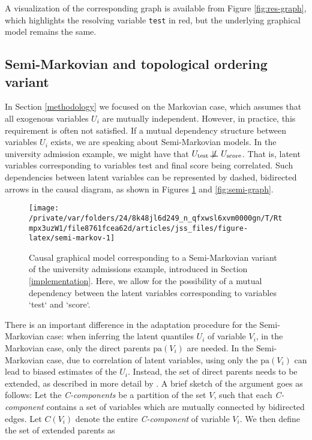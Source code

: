 \documentclass[
  nojss]{jss}
\begin{document}
A visualization of the corresponding graph is available from Figure
\ref{fig:res-graph}, which highlights the resolving variable
\texttt{test} in red, but the underlying graphical model remains the
same.

\hypertarget{semi-markovian-and-topological-ordering-variant}{%
\subsection{Semi-Markovian and topological ordering
variant}\label{semi-markovian-and-topological-ordering-variant}}

In Section \ref{methodology} we focused on the Markovian case, which
assumes that all exogenous variables \(U_i\) are mutually independent.
However, in practice, this requirement is often not satisfied. If a
mutual dependency structure between variables \(U_i\) exists, we are
speaking about Semi-Markovian models. In the university admission
example, we might have that
\(U_{\text{test}} \not\!\perp\!\!\!\perp U_{\text{score}}\). That is,
latent variables corresponding to variables test and final score being
correlated. Such dependencies between latent variables can be
represented by dashed, bidirected arrows in the causal diagram, as shown
in Figures \ref{fig:semi-markov} and \ref{fig:semi-graph}.

\begin{CodeChunk}
\begin{figure}

{\centering \texttt{[image: /private/var/folders/24/8k48jl6d249\_n\_qfxwsl6xvm0000gn/T/Rtmpx3uzW1/file8761fcea62d/articles/jss\_files/figure-latex/semi-markov-1]} 

}

\caption[Causal graphical model corresponding to a Semi-Markovian variant of the university admissions example, introduced in Section \ref{implementation}]{Causal graphical model corresponding to a Semi-Markovian variant of the university admissions example, introduced in Section \ref{implementation}. Here, we allow for the possibility of a mutual dependency between the latent variables corresponding to variables `test` and `score`.}\label{fig:semi-markov}
\end{figure}
\end{CodeChunk}

There is an important difference in the adaptation procedure for the
Semi-Markovian case: when inferring the latent quantiles \(U_i\) of
variable \(V_i\), in the Markovian case, only the direct parents
\(\mathrm{pa}(V_i)\) are needed. In the Semi-Markovian case, due to
correlation of latent variables, using only the \(\mathrm{pa}(V_i)\) can
lead to biased estimates of the \(U_i\). Instead, the set of direct
parents needs to be extended, as described in more detail by
\citet{tian2002general}. A brief sketch of the argument goes as follows:
Let the \emph{C-components} be a partition of the set \(V\), such that
each \emph{C-component} contains a set of variables which are mutually
connected by bidirected edges. Let \(C(V_i)\) denote the entire
\emph{C-component} of variable \(V_i\). We then define the set of
extended parents as
\end{document}
